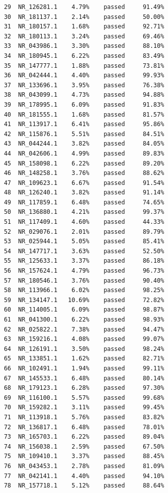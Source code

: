 \documentclass{article}
\begin{document}
\begin{verbatim}
      29  NR_126281.1    4.79%    passed     91.49%
      30  NR_181137.1    2.14%    passed     50.00%
      31  NR_180157.1    1.68%    passed     92.71%
      32  NR_180113.1    3.24%    passed     69.46%
      33  NR_043986.1    3.30%    passed     88.10%
      34  NR_180945.1    6.22%    passed     83.49%
      35  NR_147777.1    1.88%    passed     73.81%
      36  NR_042444.1    4.40%    passed     99.93%
      37  NR_133696.1    3.95%    passed     76.38%
      38  NR_043099.1    4.73%    passed     94.88%
      39  NR_178995.1    6.09%    passed     91.83%
      40  NR_181555.1    1.68%    passed     81.57%
      41  NR_113917.1    6.41%    passed     95.86%
      42  NR_115876.1    5.51%    passed     84.51%
      43  NR_044244.1    3.82%    passed     84.05%
      44  NR_042606.1    4.99%    passed     89.83%
      45  NR_158098.1    6.22%    passed     89.20%
      46  NR_148258.1    3.76%    passed     88.62%
      47  NR_109623.1    6.67%    passed     91.54%
      48  NR_126240.1    3.82%    passed     91.14%
      49  NR_117859.1    6.48%    passed     74.65%
      50  NR_136880.1    4.21%    passed     99.37%
      51  NR_117409.1    4.60%    passed     44.33%
      52  NR_029076.1    2.01%    passed     89.79%
      53  NR_025944.1    5.05%    passed     85.41%
      54  NR_147717.1    3.63%    passed     52.50%
      55  NR_125633.1    3.37%    passed     86.18%
      56  NR_157624.1    4.79%    passed     96.73%
      57  NR_180546.1    3.76%    passed     90.40%
      58  NR_113966.1    6.02%    passed     98.25%
      59  NR_134147.1   10.69%    passed     72.82%
      60  NR_114005.1    6.09%    passed     98.87%
      61  NR_041300.1    6.22%    passed     98.93%
      62  NR_025822.1    7.38%    passed     94.47%
      63  NR_159216.1    4.08%    passed     99.07%
      64  NR_126191.1    3.50%    passed     98.24%
      65  NR_133851.1    1.62%    passed     82.71%
      66  NR_102491.1    1.94%    passed     99.11%
      67  NR_145533.1    6.48%    passed     80.14%
      68  NR_179123.1    6.28%    passed     97.30%
      69  NR_116100.1    5.57%    passed     99.68%
      70  NR_159282.1    3.11%    passed     99.45%
      71  NR_113918.1    5.76%    passed     83.82%
      72  NR_136817.1    6.48%    passed     78.01%
      73  NR_165703.1    6.22%    passed     89.04%
      74  NR_156038.1    2.59%    passed     67.50%
      75  NR_109410.1    3.37%    passed     88.45%
      76  NR_043453.1    2.78%    passed     81.09%
      77  NR_042141.1    4.40%    passed     94.10%
      78  NR_157718.1    5.12%    passed     88.64%

\end{verbatim}
\end{document}
